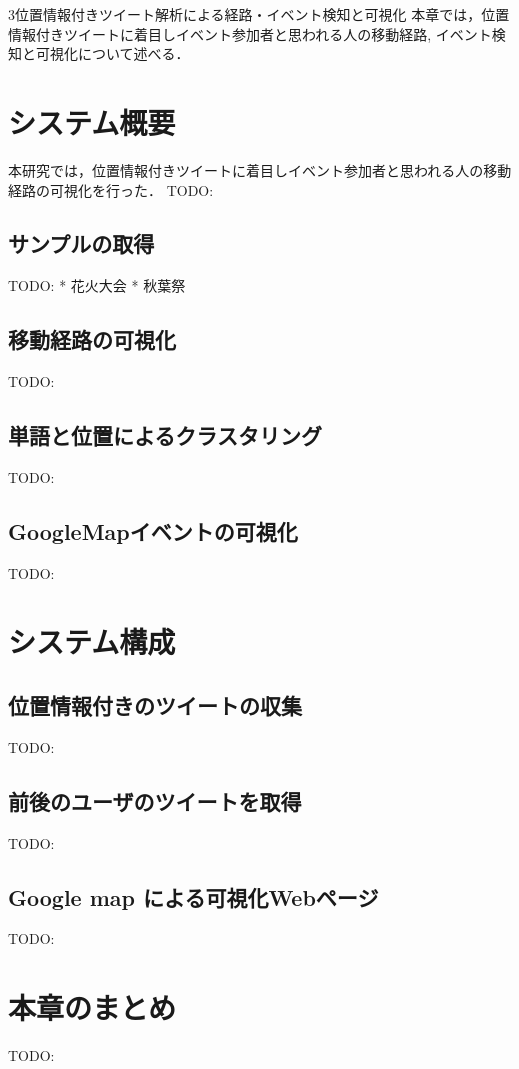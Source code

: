 \chapterhead
{3}{位置情報付きツイート解析による経路・イベント検知と可視化}
{本章では，位置情報付きツイートに着目しイベント参加者と思われる人の移動経路, イベント検知と可視化について述べる．}


\section{システム概要}
本研究では，位置情報付きツイートに着目しイベント参加者と思われる人の移動経路の可視化を行った．
TODO:

\subsection{サンプルの取得}
TODO:
* 花火大会
* 秋葉祭
\subsection{移動経路の可視化}
TODO:
\subsection{単語と位置によるクラスタリング}
TODO:
\subsection{GoogleMapイベントの可視化}
TODO:

\section{システム構成}
\subsection{位置情報付きのツイートの収集}
TODO:
\subsection{前後のユーザのツイートを取得}
TODO:
\subsection{Google map による可視化Webページ}
TODO:

\newpage

\section{本章のまとめ}
TODO:





\newpage
